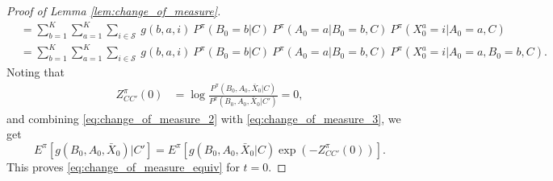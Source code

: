 \begin{proof}[Proof of Lemma \ref{lem:change_of_measure}]
\begin{align}
		&=\sum\limits_{b=1}^{K}\sum\limits_{a=1}^{K}\sum\limits_{i\in\mathcal{S}}~g(b,a,i)~P^\pi(B_0=b|C)~P^\pi(A_0=a|B_0=b,C)~P^\pi(X_0^a=i|A_0=a,C)\\
		&=\sum\limits_{b=1}^{K}\sum\limits_{a=1}^{K}\sum\limits_{i\in\mathcal{S}}~g(b,a,i)~P^\pi(B_0=b|C)~P^\pi(A_0=a|B_0=b,C)~P^\pi(X_0^a=i|A_0=a, B_0=b,C).\label{eq:change_of_measure_2}
	\end{align}\endgroup
	Noting that
	\begingroup \allowdisplaybreaks\begin{align}
		Z^\pi_{CC'}(0)&=\log \frac{P^\pi(B_0,A_0,\bar{X}_0|C)}{P^\pi(B_0,A_0,\bar{X}_0|C')}=0,\label{eq:change_of_measure_3}
	\end{align}\endgroup
	and combining \eqref{eq:change_of_measure_2} with \eqref{eq:change_of_measure_3}, we get $$
	E^\pi[g(B_0,A_0,\bar{X}_0)|C']=E^\pi[g(B_0,A_0,\bar{X}_0|C)\exp (-Z^\pi_{CC'}(0))].
	$$ This proves \eqref{eq:change_of_measure_equiv} for $t=0$.
	

\end{proof}
